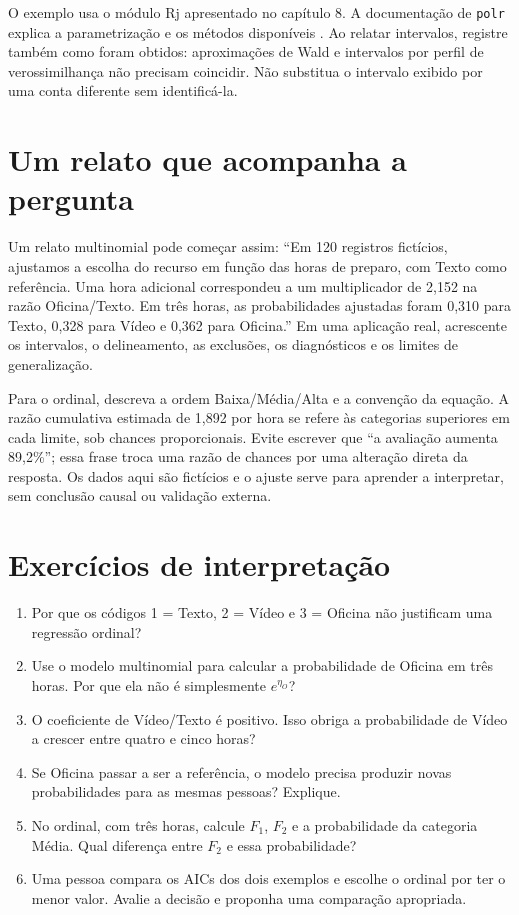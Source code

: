 O exemplo usa o módulo Rj apresentado no capítulo 8. A documentação de \texttt{polr} explica a parametrização e os métodos disponíveis \parencite{RPolr}. Ao relatar intervalos, registre também como foram obtidos: aproximações de Wald e intervalos por perfil de verossimilhança não precisam coincidir. Não substitua o intervalo exibido por uma conta diferente sem identificá-la.

\section{Um relato que acompanha a pergunta}

Um relato multinomial pode começar assim: ``Em 120 registros fictícios, ajustamos a escolha do recurso em função das horas de preparo, com Texto como referência. Uma hora adicional correspondeu a um multiplicador de 2,152 na razão Oficina/Texto. Em três horas, as probabilidades ajustadas foram 0,310 para Texto, 0,328 para Vídeo e 0,362 para Oficina.'' Em uma aplicação real, acrescente os intervalos, o delineamento, as exclusões, os diagnósticos e os limites de generalização.

Para o ordinal, descreva a ordem Baixa/Média/Alta e a convenção da equação. A razão cumulativa estimada de 1,892 por hora se refere às categorias superiores em cada limite, sob chances proporcionais. Evite escrever que ``a avaliação aumenta 89,2\%''; essa frase troca uma razão de chances por uma alteração direta da resposta. Os dados aqui são fictícios e o ajuste serve para aprender a interpretar, sem conclusão causal ou validação externa.

\section{Exercícios de interpretação}
\begin{enumerate}
\item Por que os códigos 1 = Texto, 2 = Vídeo e 3 = Oficina não justificam uma regressão ordinal?
\item Use o modelo multinomial para calcular a probabilidade de Oficina em três horas. Por que ela não é simplesmente $e^{\eta_O}$?
\item O coeficiente de Vídeo/Texto é positivo. Isso obriga a probabilidade de Vídeo a crescer entre quatro e cinco horas?
\item Se Oficina passar a ser a referência, o modelo precisa produzir novas probabilidades para as mesmas pessoas? Explique.
\item No ordinal, com três horas, calcule $F_1$, $F_2$ e a probabilidade da categoria Média. Qual diferença entre $F_2$ e essa probabilidade?
\item Uma pessoa compara os AICs dos dois exemplos e escolhe o ordinal por ter o menor valor. Avalie a decisão e proponha uma comparação apropriada.
\end{enumerate}

